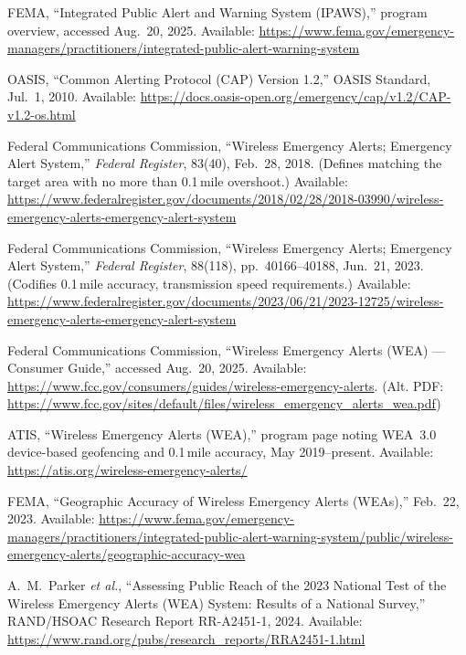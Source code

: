 \documentclass[11pt,twocolumn]{article}
\begin{document}
\FloatBarrier
\clearpage
\balance
\begin{thebibliography}{99}

FEMA, ``Integrated Public Alert and Warning System (IPAWS),'' program overview, accessed Aug.\ 20, 2025. Available: \url{https://www.fema.gov/emergency-managers/practitioners/integrated-public-alert-warning-system}

OASIS, ``Common Alerting Protocol (CAP) Version 1.2,'' OASIS Standard, Jul.\ 1, 2010. Available: \url{https://docs.oasis-open.org/emergency/cap/v1.2/CAP-v1.2-os.html}

Federal Communications Commission, ``Wireless Emergency Alerts; Emergency Alert System,'' \emph{Federal Register}, 83(40), Feb.\ 28, 2018. (Defines matching the target area with no more than 0.1\,mile overshoot.) Available: \url{https://www.federalregister.gov/documents/2018/02/28/2018-03990/wireless-emergency-alerts-emergency-alert-system}

Federal Communications Commission, ``Wireless Emergency Alerts; Emergency Alert System,'' \emph{Federal Register}, 88(118), pp.\ 40166--40188, Jun.\ 21, 2023. (Codifies 0.1\,mile accuracy, transmission speed requirements.) Available: \url{https://www.federalregister.gov/documents/2023/06/21/2023-12725/wireless-emergency-alerts-emergency-alert-system}

Federal Communications Commission, ``Wireless Emergency Alerts (WEA) — Consumer Guide,'' accessed Aug.\ 20, 2025. Available: \url{https://www.fcc.gov/consumers/guides/wireless-emergency-alerts}. (Alt. PDF: \url{https://www.fcc.gov/sites/default/files/wireless_emergency_alerts_wea.pdf})

ATIS, ``Wireless Emergency Alerts (WEA),'' program page noting WEA~3.0 device-based geofencing and 0.1\,mile accuracy, May 2019--present. Available: \url{https://atis.org/wireless-emergency-alerts/}

FEMA, ``Geographic Accuracy of Wireless Emergency Alerts (WEAs),'' Feb.\ 22, 2023. Available: \url{https://www.fema.gov/emergency-managers/practitioners/integrated-public-alert-warning-system/public/wireless-emergency-alerts/geographic-accuracy-wea}

A.\ M.\ Parker \emph{et al.}, ``Assessing Public Reach of the 2023 National Test of the Wireless Emergency Alerts (WEA) System: Results of a National Survey,'' RAND/HSOAC Research Report RR-A2451-1, 2024. Available: \url{https://www.rand.org/pubs/research_reports/RRA2451-1.html}


\end{thebibliography}
\end{document}
